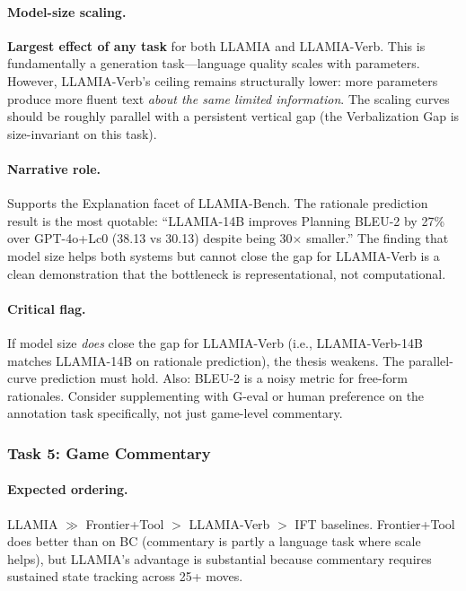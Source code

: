 \paragraph{Model-size scaling.}
\textbf{Largest effect of any task} for both LLAMIA and LLAMIA-Verb.
This is fundamentally a generation task---language quality scales
with parameters. However, LLAMIA-Verb's ceiling remains structurally
lower: more parameters produce more fluent text \emph{about the same
limited information}. The scaling curves should be roughly parallel
with a persistent vertical gap (the Verbalization Gap is
size-invariant on this task).

\paragraph{Narrative role.}
Supports the Explanation facet of LLAMIA-Bench. The rationale
prediction result is the most quotable: ``LLAMIA-14B improves
Planning BLEU-2 by 27\% over GPT-4o+Lc0 (38.13 vs 30.13) despite
being 30$\times$ smaller.'' The finding that model size helps both
systems but cannot close the gap for LLAMIA-Verb is a clean
demonstration that the bottleneck is representational, not
computational.

\paragraph{Critical flag.}
If model size \emph{does} close the gap for LLAMIA-Verb (i.e.,
LLAMIA-Verb-14B matches LLAMIA-14B on rationale prediction), the
thesis weakens. The parallel-curve prediction must hold. Also:
BLEU-2 is a noisy metric for free-form rationales. Consider
supplementing with G-eval or human preference on the annotation
task specifically, not just game-level commentary.

\subsubsection*{Task 5: Game Commentary}
\label{sec:perf_commentary}

\paragraph{Expected ordering.}
LLAMIA $\gg$ Frontier+Tool $>$ LLAMIA-Verb $>$ IFT baselines.
Frontier+Tool does better than on BC (commentary is partly a
language task where scale helps), but LLAMIA's advantage is
substantial because commentary requires sustained state tracking
across 25+ moves.

